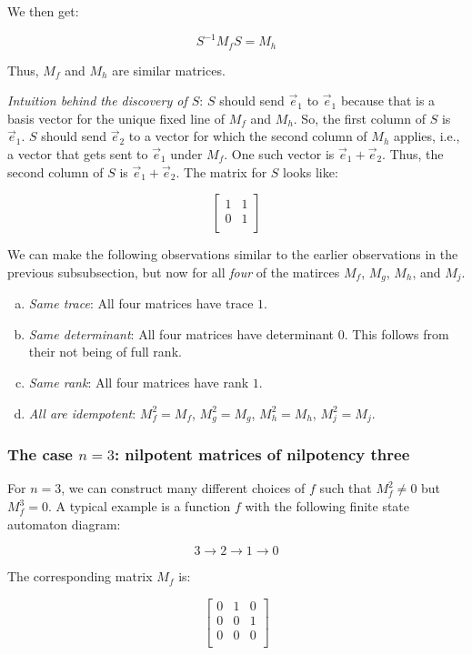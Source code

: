 \documentclass[10pt]{amsart}
\begin{document}
We then get:

$$S^{-1}M_fS = M_h$$

Thus, $M_f$ and $M_h$ are similar matrices. 

{\em Intuition behind the discovery of $S$}: $S$ should send
$\vec{e}_1$ to $\vec{e}_1$ because that is a basis vector for the
unique fixed line of $M_f$ and $M_h$. So, the first column of $S$ is
$\vec{e}_1$. $S$ should send $\vec{e}_2$ to a vector for which the
second column of $M_h$ applies, i.e., a vector that gets sent to
$\vec{e}_1$ under $M_f$. One such vector is $\vec{e}_1 +
\vec{e}_2$. Thus, the second column of $S$ is $\vec{e}_1 +
\vec{e}_2$. The matrix for $S$ looks like:

$$\left[\begin{matrix} 1 & 1 \\ 0 & 1 \\\end{matrix}\right]$$

We can make the following observations similar to the earlier
observations in the previous subsubsection, but now for all {\em four}
of the matirces $M_f$, $M_g$, $M_h$, and $M_j$.

\begin{enumerate}[(a)]
\item {\em Same trace}: All four matrices have trace $1$.
\item {\em Same determinant}: All four matrices have determinant $0$. This
  follows from their not being of full rank.
\item {\em Same rank}: All four matrices have rank $1$.
\item {\em All are idempotent}: $M_f^2 = M_f$, $M_g^2 = M_g$, $M_h^2 =
  M_h$, $M_j^2 = M_j$.
\end{enumerate}

\subsubsection{The case $n = 3$: nilpotent matrices of nilpotency three}

For $n = 3$, we can construct many different choices of $f$ such that
$M_f^2 \ne 0$ but $M_f^3 = 0$. A typical example is a function $f$
with the following finite state automaton diagram:

$$3 \to 2 \to 1 \to 0$$

The corresponding matrix $M_f$ is:

$$\left[\begin{matrix} 0 & 1 & 0 \\ 0 & 0 & 1 \\ 0 & 0 & 0 \\\end{matrix}\right]$$
\end{document}
